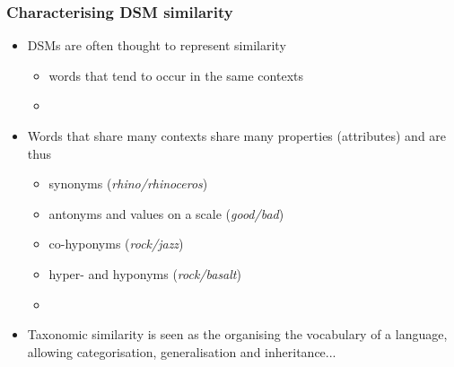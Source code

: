 \documentclass[t]{beamer} %
\begin{document}
\begin{frame}
  \frametitle{Characterising DSM similarity}
  \begin{itemize}
   \item DSMs are often thought to represent  similarity
   \begin{itemize}
    \item words that tend to occur in the same contexts
    \item[]
    \end{itemize}
  \item Words that share many contexts share many properties (attributes) and are thus 
    \begin{itemize}
    \item synonyms (\emph{rhino/rhinoceros})
    \item antonyms and values on a scale (\emph{good/bad})
    \item co-hyponyms (\emph{rock/jazz})
    \item hyper- and hyponyms (\emph{rock/basalt})
    \item[]
    \end{itemize}
  \item Taxonomic similarity is seen as the  organising the vocabulary of a language, allowing categorisation, generalisation and inheritance...
  \end{itemize}
\end{frame}
\end{document}
